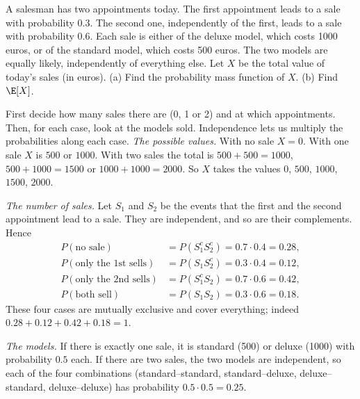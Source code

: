 
\begin{problem}
	A salesman has two appointments today. The first appointment leads to a
	sale with probability $0.3$. The second one, independently of the first,
	leads to a sale with probability $0.6$. Each sale is either of the deluxe
	model, which costs 1000 euros, or of the standard model, which costs
	500 euros. The two models are equally likely, independently of everything
	else. Let $X$ be the total value of today's sales (in euros).
	(a) Find the probability mass function of $X$.
	(b) Find $\E[X]$.
\end{problem}

\begin{solution}
	\idea First decide how many sales there are (0, 1 or 2) and at which
	appointments. Then, for each case, look at the models sold. Independence
	lets us multiply the probabilities along each case.
	 \emph{The possible values.} With no sale $X=0$. With one sale
	$X$ is $500$ or $1000$. With two sales the total is $500+500=1000$,
	$500+1000=1500$ or $1000+1000=2000$. So $X$ takes the values
	$0$, $500$, $1000$, $1500$, $2000$.

	\emph{The number of sales.} Let $S_1$ and $S_2$ be the events that the
	first and the second appointment lead to a sale. They are independent, and
	so are their complements. Hence
	\[ \begin{aligned}
		P(\text{no sale})            & =P(S_1^cS_2^c)=0.7\cdot0.4=0.28,  \\
		P(\text{only the 1st sells}) & =P(S_1S_2^c)=0.3\cdot0.4=0.12,    \\
		P(\text{only the 2nd sells}) & =P(S_1^cS_2)=0.7\cdot0.6=0.42,    \\
		P(\text{both sell})          & =P(S_1S_2)=0.3\cdot0.6=0.18.
	\end{aligned} \]
	These four cases are mutually exclusive and cover everything; indeed
	$0.28+0.12+0.42+0.18=1$.

	\emph{The models.} If there is exactly one sale, it is standard (500)
	or deluxe (1000) with probability $0.5$ each. If there are two sales, the
	two models are independent, so each of the four combinations
	(standard--standard, standard--deluxe, deluxe--standard, deluxe--deluxe)
	has probability $0.5\cdot0.5=0.25$.


\end{solution}
